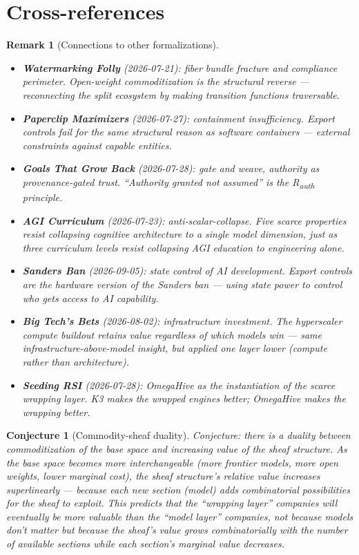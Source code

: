 \documentclass[11pt,a4paper]{article}
\newtheorem{conjecture}[definition]{Conjecture}
\newtheorem{remark}[definition]{Remark}
\begin{document}

\section{Cross-references}

\begin{remark}[Connections to other formalizations]
\begin{itemize}
\item \textbf{Watermarking Folly} (2026-07-21): fiber bundle fracture
  and compliance perimeter. Open-weight commoditization is the
  structural reverse --- reconnecting the split ecosystem by making
  transition functions traversable.
\item \textbf{Paperclip Maximizers} (2026-07-27): containment
  insufficiency. Export controls fail for the same structural
  reason as software containers --- external constraints against
  capable entities.
\item \textbf{Goals That Grow Back} (2026-07-28): gate and weave,
  authority as provenance-gated trust. ``Authority granted not
  assumed'' is the R\textsubscript{auth} principle.
\item \textbf{AGI Curriculum} (2026-07-23): anti-scalar-collapse.
  Five scarce properties resist collapsing cognitive architecture
  to a single model dimension, just as three curriculum levels
  resist collapsing AGI education to engineering alone.
\item \textbf{Sanders Ban} (2026-09-05): state control of AI
  development. Export controls are the hardware version of the
  Sanders ban --- using state power to control who gets access
  to AI capability.
\item \textbf{Big Tech's Bets} (2026-08-02): infrastructure
  investment. The hyperscaler compute buildout retains value
  regardless of which models win --- same infrastructure-above-model
  insight, but applied one layer lower (compute rather than
  architecture).
\item \textbf{Seeding RSI} (2026-07-28): OmegaHive as the
  instantiation of the scarce wrapping layer. K3 makes the
  wrapped engines better; OmegaHive makes the wrapping better.
\end{itemize}
\end{remark}

\begin{conjecture}[Commodity-sheaf duality]
Conjecture: there is a duality between commoditization of the base
space and increasing value of the sheaf structure. As the base space
becomes more interchangeable (more frontier models, more open weights,
lower marginal cost), the sheaf structure's relative value increases
superlinearly --- because each new section (model) adds combinatorial
possibilities for the sheaf to exploit. This predicts that the
``wrapping layer'' companies will eventually be more valuable than
the ``model layer'' companies, not because models don't matter but
because the sheaf's value grows combinatorially with the number of
available sections while each section's marginal value decreases.
\end{conjecture}
\end{document}
